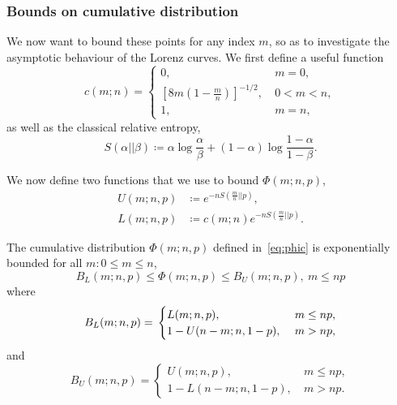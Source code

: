 \documentclass[pra,
aps,
twocolumn,
superscriptaddress,
groupedaddress,
nofootinbib,
reprint
]{revtex4-1}
\begin{document}
\subsubsection{Bounds on cumulative distribution}

We now want to bound these points for any index $m$, so as to investigate the asymptotic behaviour of the Lorenz curves.
We first define a useful function
\begin{equation}
	c(m;n) = 
	\begin{cases}
		0,&\ m=0, \\
		\left[8m\left(1-\frac{m}{n}\right)\right]^{-1/2},&\ 0<m<n, \\
		1,&\ m=n,
	\end{cases}
\end{equation}
as well as the classical relative entropy,
\begin{equation}
	S(\alpha||\beta) \coloneqq \alpha \log{\frac{\alpha}{\beta}} + (1-\alpha) \log{\frac{1-\alpha}{1-\beta}}.
\end{equation}

We now define two functions that we use to bound $\Phi(m;n,p)$,
\begin{align}
	U(m;n,p) &\coloneqq	e^{-nS\left(\frac{m}{n}||p \right)} \label{eq:ubd}, \\
	L(m;n,p) &\coloneqq c(m;n)e^{-nS\left(\frac{m}{n}||p \right)} \label{eq:lbd}.
\end{align}

\begin{lemma}\label{lem:ulbd}
	The cumulative distribution $\Phi(m;n,p)$ defined in~\cref{eq:phic} is exponentially bounded for all $m: 0\leq m \leq n$,
	\begin{equation}
		B_L(m;n,p) \leq \Phi(m;n,p) \leq B_U(m;n,p),\ m\leq np
	\end{equation}
	where
	\begin{equation}
		B_L(m;n,p) = \\
		\begin{cases}
			L(m;n,p),&\ m \leq np, \\
			1 - U(n-m;n,1-p),&\ m > np,
		\end{cases}
	\end{equation}
	and
	\begin{equation}
		B_U(m;n,p) =
		\begin{cases}
			U(m;n,p),&\ m \leq np, \\
			1 - L(n-m;n,1-p),&\ m > np.
		\end{cases}
	\end{equation}
\end{lemma}
\end{document}
